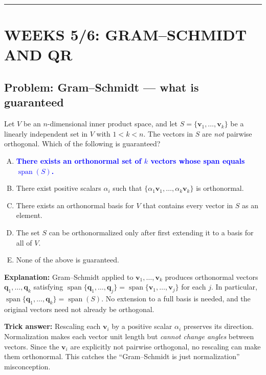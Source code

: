 \documentclass[12pt]{amsart}
\newcommand{\divider}{
  \vspace{-1em}
  \noindent
  \raisebox{-0.15ex}{\textbullet}%
  \hspace{0.5em}%
  \rule[0.5ex]{0.95\textwidth}{1.0pt}%
  \hspace{0.5em}%
  \raisebox{-0.15ex}{\textbullet}%
  \vspace{0em}
}
\begin{document}
\divider

\section*{WEEKS 5/6: GRAM--SCHMIDT AND QR}

\subsection*{Problem: Gram--Schmidt --- what is guaranteed}

Let $V$ be an $n$-dimensional inner product space, and let
$S = \{\mathbf{v}_1, \ldots, \mathbf{v}_k\}$ be a linearly independent set in $V$
with $1 < k < n$.
The vectors in $S$ are \emph{not} pairwise orthogonal.
Which of the following is guaranteed?

\begin{enumerate}[(A)]
\item \textcolor{blue}{\textbf{There exists an orthonormal set of $k$ vectors whose span equals $\operatorname{span}(S)$.}}
\item There exist positive scalars $\alpha_i$ such that $\{\alpha_1\mathbf{v}_1, \ldots, \alpha_k\mathbf{v}_k\}$ is orthonormal.
\item There exists an orthonormal basis for $V$ that contains every vector in $S$ as an element.
\item The set $S$ can be orthonormalized only after first extending it to a basis for all of $V$.
\item None of the above is guaranteed.
\end{enumerate}

\textbf{Explanation:}
Gram--Schmidt applied to $\mathbf{v}_1,\ldots,\mathbf{v}_k$ produces orthonormal vectors
$\mathbf{q}_1,\ldots,\mathbf{q}_k$ satisfying
$\operatorname{span}\{\mathbf{q}_1,\ldots,\mathbf{q}_j\} = \operatorname{span}\{\mathbf{v}_1,\ldots,\mathbf{v}_j\}$
for each $j$.
In particular, $\operatorname{span}\{\mathbf{q}_1,\ldots,\mathbf{q}_k\} = \operatorname{span}(S)$.
No extension to a full basis is needed, and the original vectors need not
already be orthogonal.

\textbf{Trick answer:}
Rescaling each $\mathbf{v}_i$ by a positive scalar $\alpha_i$ preserves its
direction.
Normalization makes each vector unit length but \emph{cannot change angles}
between vectors.
Since the $\mathbf{v}_i$ are explicitly not pairwise orthogonal, no rescaling can
make them orthonormal.
This catches the ``Gram--Schmidt is just normalization'' misconception.
\end{document}
